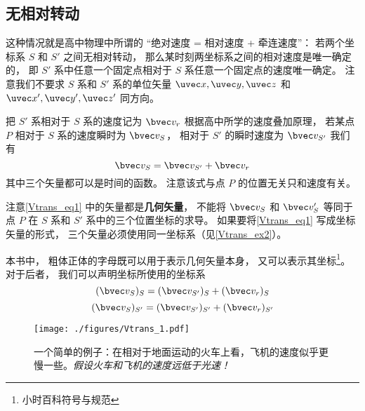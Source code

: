


\subsection{无相对转动}
这种情况就是高中物理中所谓的 “绝对速度 = 相对速度 + 牵连速度”： 若两个坐标系 $S$ 和 $S'$ 之间无相对转动， 那么某时刻两坐标系之间的相对速度是唯一确定的， 即 $S'$ 系中任意一个固定点相对于 $S$ 系任意一个固定点的速度唯一确定。 注意我们不要求 $S$ 系和 $S'$ 系的单位矢量 $\uvec x, \uvec y, \uvec z$ 和 $\uvec x', \uvec y', \uvec z'$ 同方向。

把 $S'$ 系相对于 $S$ 系的速度记为 $\bvec v_r$ 根据高中所学的速度叠加原理， 若某点 $P$ 相对于 $S$ 系的速度瞬时为 $\bvec v_S$， 相对于 $S'$ 的瞬时速度为 $\bvec v_{S'}$ 我们有
\begin{equation}\label{Vtrans_eq1}
\bvec v_{S} = \bvec v_{S'} + \bvec v_r
\end{equation}
其中三个矢量都可以是时间的函数。 注意该式与点 $P$ 的位置无关只和速度有关。

注意\autoref{Vtrans_eq1} 中的矢量都是\textbf{几何矢量}， 不能将 $\bvec v_S$ 和 $\bvec v_S'$ 等同于点 $P$ 在 $S$ 系和 $S'$ 系中的三个位置坐标的求导。 如果要将\autoref{Vtrans_eq1} 写成坐标矢量的形式， 三个矢量必须使用同一坐标系（见\autoref{Vtrans_ex2}）。

本书中， 粗体正体的字母既可以用于表示几何矢量本身， 又可以表示其坐标\footnote{小时百科符号与规范}。 对于后者， 我们可以声明坐标所使用的坐标系
\begin{equation}\label{Vtrans_eq5}
(\bvec v_{S})_{S} = (\bvec v_{S'})_{S} + (\bvec v_r)_{S}
\end{equation}
\begin{equation}\label{Vtrans_eq6}
(\bvec v_{S})_{S'} = (\bvec v_{S'})_{S'} + (\bvec v_r)_{S'}
\end{equation}

\begin{figure}[ht]
\centering
\texttt{[image: ./figures/Vtrans\_1.pdf]}
\caption{一个简单的例子：在相对于地面运动的火车上看，飞机的速度似乎更慢一些。\textsl{假设火车和飞机的速度远低于光速！}} \label{Vtrans_fig1}
\end{figure}



